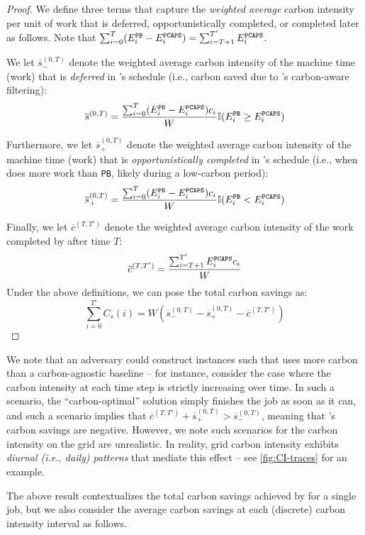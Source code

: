 \begin{proof}
We define three terms that capture the \textit{weighted average} carbon intensity per unit of work that is deferred, opportunistically completed, or completed later as follows.  
Note that $\sum_{i=0}^{T} (E^\texttt{PB}_i-E^\texttt{PCAPS}_i) = \sum_{i=T+1}^{T'} E^\texttt{PCAPS}_i$.

We let $\overline{s}_{-}^{(0,T)}$ denote the weighted average carbon intensity of the machine time (work) that is \textit{deferred} in \DANISH's schedule (i.e., carbon saved due to \DANISH's carbon-aware filtering):
\[
\overline{s}^{(0,T)} = \frac{\sum_{i=0}^{T} (E^\texttt{PB}_i-E^\texttt{PCAPS}_i) c_i}{W} \mathbb{I}(E^\texttt{PB}_i \geq E^\texttt{PCAPS}_i)
\]

Furthermore, we let $\overline{s}_{+}^{(0,T)}$ denote the weighted average carbon intensity of the machine time (work) that is \textit{opportunistically completed} in \DANISH's schedule (i.e., when \DANISH does more work than \texttt{PB}, likely during a low-carbon period):
\[
\overline{s}_{+}^{(0,T)} = \frac{\sum_{i=0}^{T} (E^\texttt{PB}_i-E^\texttt{PCAPS}_i) c_i}{W} \mathbb{I}(E^\texttt{PB}_i < E^\texttt{PCAPS}_i)
\]

Finally, we let $\overline{c}^{(T, T')}$ denote the weighted average carbon intensity of the work completed by \DANISH after time $T$:
\[
\overline{c}^{(T,T')} = \frac{\sum_{i=T+1}^{T'} E^\texttt{PCAPS}_i c_i}{W}
\]
Under the above definitions, we can pose the total carbon savings as:
\[
\sum_{i=0}^{T'} C_s(i) = W \left( \overline{s}_{-}^{(0,T)} -\overline{s}_{+}^{(0,T)} - \overline{c}^{(T,T')} \right)
\]


\end{proof}

\noindent We note that an adversary could construct instances such that \PCAPS  uses more carbon than a carbon-agnostic baseline -- for instance, consider the case where the carbon intensity at each time step is strictly increasing over time.  In such a scenario, the ``carbon-optimal'' solution simply finishes the job as soon as it can, and such a scenario implies that $\overline{c}^{(T,T')} + \overline{s}_{+}^{(0,T)} > \overline{s}_{-}^{(0,T)}$, meaning that \PCAPS's carbon savings are negative.  However, we note such scenarios for the carbon intensity on the grid are unrealistic.  In reality, grid carbon intensity exhibits \textit{diurnal (i.e., daily) patterns} that mediate this effect -- see \autoref{fig:CI-traces} for an example. 


The above result contextualizes the total carbon savings achieved by \DANISH for a single job, but we also consider the average carbon savings at each (discrete) carbon intensity interval as follows.

